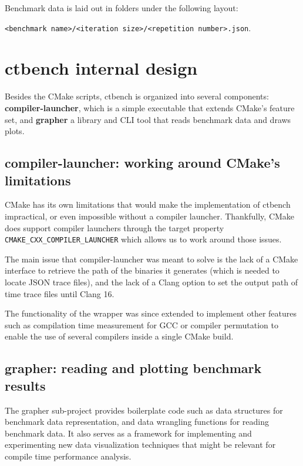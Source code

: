 \documentclass[../main]{subfiles}
\begin{document}
Benchmark data is laid out in folders under the following layout:

\lstinline{<benchmark name>/<iteration size>/<repetition number>.json}.

\section{
  ctbench internal design
}

Besides the CMake scripts, ctbench is organized into several components:
\textbf{compiler-launcher}, which is a simple executable that extends CMake's
feature set, and \textbf{grapher} a \cpp library and CLI tool that reads
benchmark data and draws plots.

\subsection{
  compiler-launcher: working around CMake's limitations
}

CMake has its own limitations that would make the implementation of ctbench
impractical, or even impossible without a compiler launcher. Thankfully, CMake
does support compiler launchers through the target property
\lstinline{CMAKE_CXX_COMPILER_LAUNCHER} which allows us to work around
those issues.

The main issue that compiler-launcher was meant to solve is the lack of
a CMake interface to retrieve the path of the binaries it generates (which is
needed to locate JSON trace files), and the lack of a Clang option to set
the output path of time trace files until Clang 16.

The functionality of the wrapper was since extended to implement other features
such as compilation time measurement for GCC or compiler permutation
to enable the use of several \cpp compilers inside a single CMake build.

\subsection{
  grapher: reading and plotting benchmark results
}

The grapher sub-project provides boilerplate code such as data structures
for benchmark data representation, and data wrangling functions for reading
benchmark data. It also serves as a framework for implementing and experimenting
new data visualization techniques that might be relevant for compile time
performance analysis.
\end{document}
